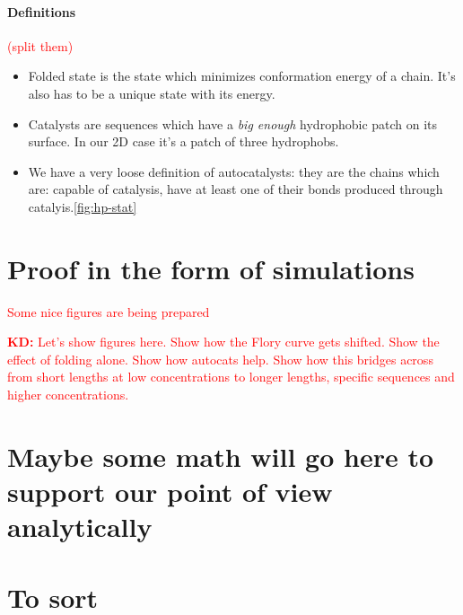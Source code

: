 \documentclass[12pt]{paper}
\newcommand{\red}[1]{\textcolor{red}{#1}}
\begin{document}
\paragraph{Definitions} \red{(split them)}
\begin{itemize}
  \item Folded state is the state which minimizes conformation energy of a chain. 
  It's also has to be a unique state with its energy.
  \item Catalysts are sequences which have a \textit{big enough} hydrophobic patch on its 
  surface. In our 2D case it's a patch of three hydrophobs.
  \item We have a very loose definition of autocatalysts:
  they are the chains which are: capable of catalysis, have at least one of their bonds produced 
  through catalyis.\ref{fig:hp-stat}
\end{itemize}


\section{Proof in the form of simulations}
\red{Some nice figures are being prepared}

\red {\textbf{KD:} Let’s show figures here.  Show how the Flory curve gets shifted.  Show the 
effect of folding alone.  Show how autocats help.  Show how this bridges across from short lengths 
at low concentrations to longer lengths, specific sequences and higher concentrations.}
\section{Maybe some math will go here to support our point of view analytically}


 \newpage
 \section{To sort}
 
\end{document}
